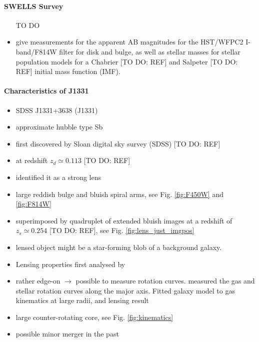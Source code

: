 \paragraph{SWELLS Survey}
\begin{itemize}
\item [TO DO]
\item \citet{SWELLSI} give measurements for the apparent AB magnitudes for the HST/WFPC2 I-band/F814W filter for disk and bulge, as well as stellar masses for stellar population models for a Chabrier [TO DO: REF] and Salpeter [TO DO: REF] initial mass function (IMF). 
\end{itemize}


\paragraph{Characteristics of J1331}
\begin{itemize}
\item SDSS J1331+3638 (J1331)
\item approximate hubble type Sb
\item first discovered by Sloan digital sky survey (SDSS) [TO DO: REF]
\item at redshift $z_d\simeq0.113$ [TO DO: REF]
\item \citet{SWELLSI} identified it as a strong lens
\item large reddish bulge and bluish spiral arms, see Fig. \ref{fig:F450W} and \ref{fig:F814W}
\item superimposed by quadruplet of extended bluish images at a redshift of $z_s\simeq0.254$ [TO DO: REF], see Fig. \ref{fig:lens_just_imgpos}
\item lensed object might be a star-forming blob of a background galaxy.
\item Lensing properties first analysed by \citet{SWELLSIII}
\item rather edge-on $\longrightarrow$ possible to measure rotation curves. \citet{SWELLSV} measured the gas and stellar rotation curves along the major axis. Fitted galaxy model to gas kinematics at large radii, and lensing result
\item large counter-rotating core, see Fig. \ref{fig:kinematics}
\item possible minor merger in the past
\end{itemize}

